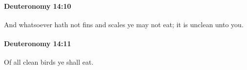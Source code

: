 		\paragraph{Deuteronomy 14:10} %
			\label{DEUTERONOMY-14-10}

			And whatsoever hath not fins and scales ye may not eat; it is unclean unto you.


		\paragraph{Deuteronomy 14:11} %
			\label{DEUTERONOMY-14-11}

			Of all clean birds ye shall eat.


